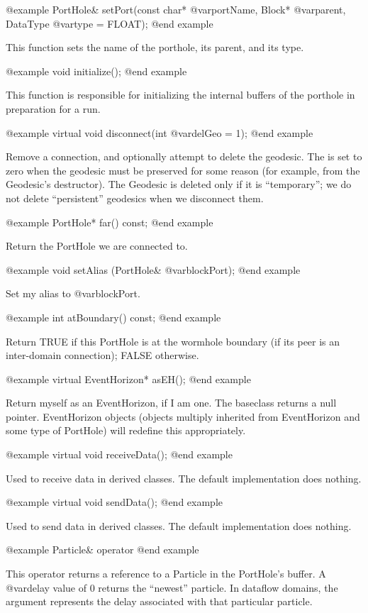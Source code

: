 @example
PortHole& setPort(const char* @var{portName}, Block* @var{parent},
                 DataType @var{type} = FLOAT);
@end example

This function sets the name of the porthole, its parent, and
its type.

@example
void initialize();
@end example

This function is responsible for initializing the internal buffers
of the porthole in preparation for a run.

@example
virtual void disconnect(int @var{delGeo} = 1);
@end example

Remove a connection, and optionally attempt to delete the geodesic.  The
is set to zero when the geodesic must be preserved for some reason (for
example, from the Geodesic's destructor).  The Geodesic is deleted only
if it is ``temporary''; we do not delete ``persistent'' geodesics when
we disconnect them.

@example
PortHole* far() const;
@end example

Return the PortHole we are connected to.

@example
void setAlias (PortHole& @var{blockPort});
@end example

Set my alias to @var{blockPort}.

@example
int atBoundary() const;
@end example

Return TRUE if this PortHole is at the wormhole boundary (if its peer is
an inter-domain connection); FALSE otherwise.

@example
virtual EventHorizon* asEH();
@end example

Return myself as an EventHorizon, if I am one.  The baseclass returns
a null pointer.  EventHorizon objects (objects multiply inherited from
EventHorizon and some type of PortHole) will redefine this
appropriately.

@example
virtual void receiveData();
@end example

Used to receive data in derived classes.  The default implementation
does nothing.

@example
virtual void sendData();
@end example

Used to send data in derived classes.  The default implementation
does nothing.

@example
Particle& operator %
@end example

This operator returns a reference to a Particle in the PortHole's
buffer.  A @var{delay} value of 0 returns the ``newest'' particle.
In dataflow domains, the argument represents the delay associated
with that particular particle.

